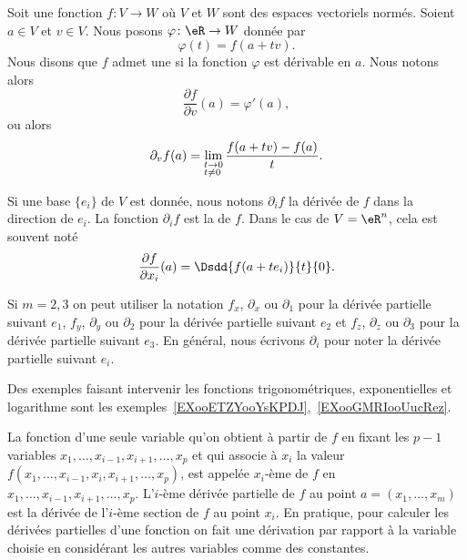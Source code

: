 \begin{definition}      \label{DEFooCATTooTPLtpR}
	Soit une fonction \( f\colon V\to W\) où \( V\) et \( W\) sont des espaces vectoriels normés. Soient \( a\in V\) et \( v\in V\). Nous posons \( \varphi\colon \eR\to W\) donnée par
	\begin{equation}
		\varphi(t)=f(a+tv).
	\end{equation}
	Nous disons que \( f\) admet une  si la fonction \( \varphi\) est dérivable en \( a\). Nous notons alors
	\begin{equation}
		\frac{ \partial f }{ \partial v }(a)=\varphi'(a),
	\end{equation}
	ou alors
	\begin{equation}
		\partial_v f(a)=\lim_{ \begin{subarray}{l} t\to 0\\ t\neq 0 \end{subarray} }\frac{f(a+tv)-f(a)}{t}.
	\end{equation}

	Si une base \( \{ e_i \}\) de \( V\) est donnée, nous notons \( \partial_if\) la dérivée de \( f\) dans la direction de \( e_i\). La fonction \( \partial_if\) est la  de \( f\). Dans le cas de \( V=\eR^n\), cela est souvent noté
	\begin{equation}
		\frac{ \partial f }{ \partial x_i }(a)=\Dsdd{ f(a+ te_i) }{t}{0}.
	\end{equation}
\end{definition}

Si \( m=2,3\) on peut utiliser la notation \( f_x\), \( \partial_x\)  ou \( \partial_1\) pour la dérivée partielle suivant \( e_1\), \( f_y\), \( \partial_y\)  ou \( \partial_2\)  pour la dérivée partielle suivant \( e_2\) et \( f_z\),  \( \partial_z\)  ou \( \partial_3\)  pour la dérivée partielle suivant \( e_3\). En général, nous écrivons \( \partial_i\) pour noter la dérivée partielle suivant \( e_i\).

Des exemples faisant intervenir les fonctions trigonométriques, exponentielles et logarithme sont les exemples~\ref{EXooETZYooYsKPDJ},~\ref{EXooGMRIooUucRez}.

La fonction d'une seule variable qu'on obtient à partir de \( f\) en fixant les \( p-1\) variables  \( x_1,\ldots, x_{i-1}, x_{i+1}, \ldots, x_p\) et qui associe à \( x_i\) la valeur \( f(x_1,\ldots, x_{i-1}, x_i, x_{i+1}, \ldots, x_p)\), est appelée \( x_i\)-ème  de \( f\) en \( x_1,\ldots, x_{i-1}, x_{i+1}, \ldots, x_p\). L'\( i\)-ème dérivée partielle de \( f\) au point \( a=(x_1,\ldots,x_m)\) est la dérivée de l'\( i\)-ème section de \( f\) au point \( x_i\). En pratique, pour calculer les dérivées partielles d'une fonction on fait une dérivation par rapport à la variable choisie en considérant les  autres variables comme des constantes.

